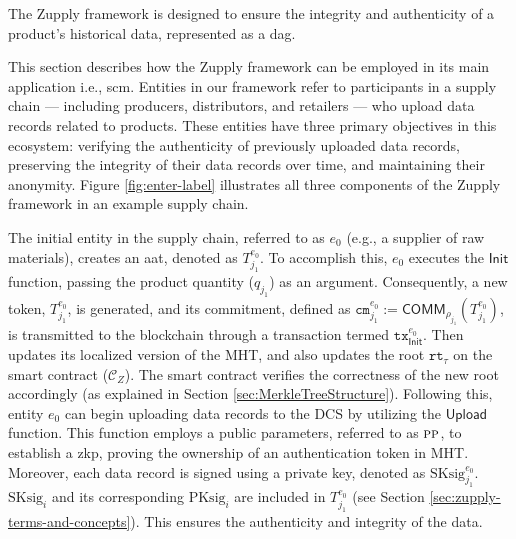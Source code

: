 The Zupply framework is designed to ensure the integrity and authenticity of a product's historical data, represented as a \gls{dag}. 

This section describes how the Zupply framework can be employed in its main application i.e., \gls{scm}. Entities in our framework refer to participants in a supply chain — including producers, distributors, and retailers — who upload data records related to products. These entities have three primary objectives in this ecosystem: verifying the authenticity of previously uploaded data records, preserving the integrity of their data records over time, and maintaining their anonymity. Figure \ref{fig:enter-label} illustrates all three components of the Zupply framework in an example supply chain.

The initial entity in the supply chain, referred to as $e_{0}$ (e.g., a supplier of raw materials), creates an \gls{aat}, denoted as $T^{e_{0}}_{j_1}$. To accomplish this, $e_{0}$ executes the $\mathsf{Init}$ function, passing the product quantity ($q_{j_1}$) as an argument. Consequently, a new token, $T^{e_{0}}_{j_1}$, is generated, and its commitment, defined as $\texttt{cm}^{e_{0}}_{j_1} := \mathsf{COMM}_{\rho_{j_1}}(T^{e_{0}}_{j_1})$, is transmitted to the blockchain through a transaction termed $\texttt{tx}^{e_{0}}_\mathsf{Init}$. Then updates its localized version of the \textsf{MHT}, and also updates the root $\texttt{rt}_\tau$ on the smart contract ($\mathcal{C}_Z$). The smart contract verifies the correctness of the new root accordingly (as explained in Section \ref{sec:MerkleTreeStructure}). Following this, entity $e_0$ can begin uploading data records to the DCS by utilizing the $\mathsf{Upload}$ function. This function employs a public parameters, referred to as $\textsc{pp}$, to establish a \gls{zkp}, proving the ownership of an authentication token in \textsf{MHT}. Moreover, each data record is signed using a private key, denoted as \( \text{SKsig}^{e_{0}}_{{j_1}} \). $\text{SKsig}_{i}$ and its corresponding $\text{PKsig}_{i}$ are included in \( T^{e_{0}}_{j_1} \) (see Section \ref{sec:zupply-terms-and-concepts}). This ensures the authenticity and integrity of the data.



